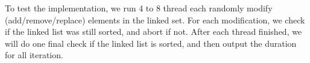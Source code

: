 \documentclass{article}
\begin{document}
To test the implementation, we run 4 to 8 thread each randomly modify
(add/remove/replace) elements in the linked set. For each modification, we
check if the linked list was still sorted, and abort if not. After each thread
finished, we will do one final check if the linked list is sorted, and then
output the duration for all iteration.
\end{document}
